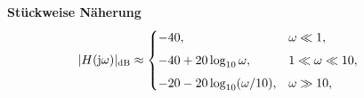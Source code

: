 \vspace{0.5cm}
\medskip
\noindent\textbf{Stückweise Näherung}
\[
|H(\operatorname{j}\!\omega)|_{\mathrm{dB}}\approx
\begin{cases}
-40,& \omega\ll1,\\[4pt]
-40+20\log_{10}\omega,& 1\ll\omega\ll10,\\[4pt]
-20-20\log_{10}(\omega/10),& \omega\gg10,
\end{cases}
\qquad
\]
\newpage